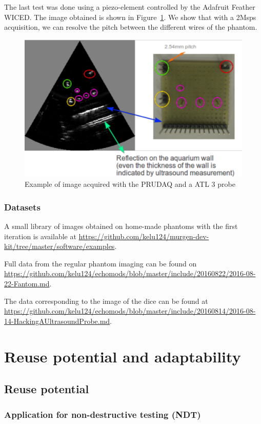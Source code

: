 \documentclass[letterpaper, 10 pt, conference]{ieeeconf} %
\begin{document}
The last test was done using a piezo-element controlled by the Adafruit Feather WICED. The image obtained is shown in Figure~\ref{fig:wirelessimage}. We show that with a 2Msps acquisition, we can resolve the pitch between the different wires of the phantom.

\begin{figure}%
\centering
\includegraphics[width=.8\linewidth]{wireless}
\caption{Example of image acquired with the PRUDAQ and a ATL 3 probe}
\label{fig:wirelessimage}
\end{figure}


\subsubsection{Datasets}

A small library of images obtained on home-made phantoms with the first iteration is available at \url{https://github.com/kelu124/murgen-dev-kit/tree/master/software/examples}.

Full data from the regular phantom imaging can be found on \url{https://github.com/kelu124/echomods/blob/master/include/20160822/2016-08-22-Fantom.md}.

The data corresponding to the image of the dice can be found at \url{https://github.com/kelu124/echomods/blob/master/include/20160814/2016-08-14-HackingAUltrasoundProbe.md}. 


\section{Reuse potential and adaptability} 

\subsection{Reuse potential}

\subsubsection{Application for non-destructive testing (NDT)} 
\end{document}
